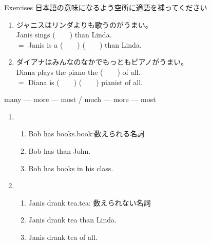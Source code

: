 \documentclass[aspectratio=169,xcolor={dvipsnames,table}]{beamer}
\begin{document}
\begin{frame}[plain]{Exercises}
日本語の意味になるよう空所に適語を補ってください%
\hfill{\scriptsize {}}
\begin{enumerate}
 \item ジャニスはリンダよりも歌うのがうまい。\\
       Janis sings (~~~~) than Linda.\\
       $=$\,\,Janis is a  (~~~~)  (~~~~) than Linda.
 \item ダイアナはみんなのなかでもっともピアノがうまい。\\
       Diana plays the piano the (~~~~) of all.\\
       $=$\,\,Diana is (~~~~)  (~~~~) pianist of all.
\end{enumerate}
\end{frame}
\begin{frame}[plain]{many --- more --- most / much --- more --- most}
 \begin{enumerate}
  \item \begin{enumerate}
	 \item<1-> Bob has  books.\hfill{\scriptsize book:数えられる名詞}
	 \item<2-> Bob has  than John.
	 \item<3-> Bob has  books in his class.
	\end{enumerate}
  \item \begin{enumerate}
	 \item<4-> Janis drank  tea.\hfill{\scriptsize tea: 数えられない名詞}
	 \item<5-> Janis drank  tea than Linda.
	 \item<6-> Janis drank  tea of all. 

	\end{enumerate}
 \end{enumerate}
%
\hfill{\scriptsize {}}
\end{frame}
\end{document}
